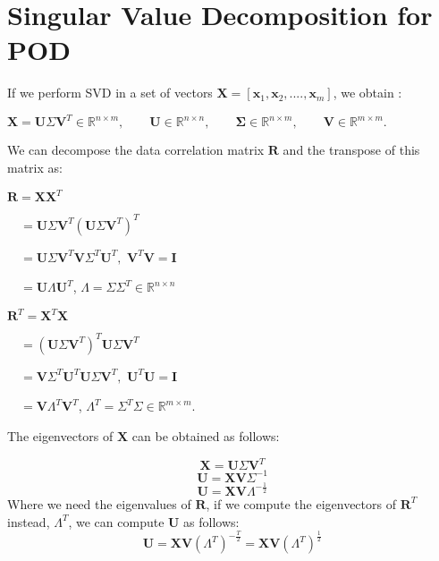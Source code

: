 \documentclass[12pt]{article}
\begin{document}
{\section{Singular Value Decomposition for POD}\label{a3}
\hspace{0.5cm}If we perform SVD in a set of vectors $\mathbf{X}=[\mathbf{x}_1,\mathbf{x}_2,....,\mathbf{x}_m]$, we obtain \cite{Leader04}:\par
$\mathbf{X}=\mathbf{U}\Sigma \mathbf{V}^T \in \mathbb{R}^{n \times m}, \qquad \mathbf{U}\in\mathbb{R}^{n \times n},\qquad \mathbf{\Sigma}\in\mathbb{R}^{n \times m}, \qquad \mathbf{V}\in\mathbb{R}^{m \times m}.$\par
We can decompose the data correlation matrix $\mathbf{R}$ and the transpose of this matrix as:
\begin{itemize}
\begin{minipage}{.5\textwidth}
\item[]  $\mathbf{R}= \mathbf{X}\mathbf{X}^T$
 \item[] $\quad=\mathbf{U}\Sigma \mathbf{V}^T(\mathbf{U}\Sigma \mathbf{V}^T)^T$
 \item[] $\quad=\mathbf{U}\Sigma \mathbf{V}^T\mathbf{V}\Sigma ^T\mathbf{U}^T,$ $\mathbf{V}^T\mathbf{V}=\mathbf{I}$ 
  \item[] $\quad=\mathbf{U}\Lambda \mathbf{U}^T$, 
  $\Lambda=\Sigma\Sigma ^T \in\mathbb{R}^{n \times n}$ 
\end{minipage}%
\begin{minipage}{.4\textwidth}
\item[] $\mathbf{R}^T= \mathbf{X}^T\mathbf{X}$
 \item[] $\quad=(\mathbf{U}\Sigma \mathbf{V}^T)^T\mathbf{U}\Sigma \mathbf{V}^T$
 \item[] $\quad=\mathbf{V}\Sigma ^T\mathbf{U}^T\mathbf{U}\Sigma \mathbf{V}^T,$ $\mathbf{U}^T\mathbf{U}=\mathbf{I}$ 
  \item[] $\quad=\mathbf{V}\Lambda^T \mathbf{V}^T$, 
  $\Lambda^T=\Sigma ^T\Sigma \in\mathbb{R}^{m \times m}.$
\end{minipage}
\end{itemize}
The eigenvectors of $\mathbf{X}$ can be obtained as follows:

$$\mathbf{X}=\mathbf{U}\Sigma \mathbf{V}^T$$
$$\mathbf{U}=\mathbf{X}\mathbf{V}\Sigma^{-1}$$
$$\mathbf{U}=\mathbf{X}\mathbf{V}\Lambda^{-\frac{1}{2}}$$
 Where we need the eigenvalues of $\mathbf{R}$, if we compute the eigenvectors 
 of $\mathbf{R}^T$ instead, $\Lambda^T$, we can compute $\mathbf{U}$ as follows:
$$\mathbf{U}=\mathbf{X}\mathbf{V}(\Lambda^T)^{-\frac{T}{2}}=\mathbf{X}\mathbf{V}(\Lambda^T)^{\frac{1}{2}}$$

}
\end{document}
